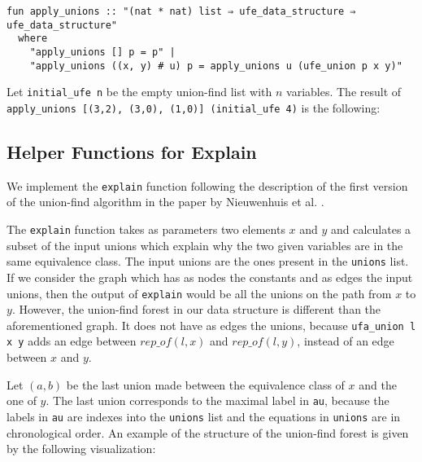 \begin{lstlisting}
fun apply_unions :: "(nat * nat) list ⇒ ufe_data_structure ⇒ ufe_data_structure"
  where
    "apply_unions [] p = p" |
    "apply_unions ((x, y) # u) p = apply_unions u (ufe_union p x y)"
\end{lstlisting}

\begin{exmp}\label{example:apply-unions}
Let \lstinline|initial_ufe n| be the empty union-find list with $n$ variables. The result of \lstinline|apply_unions [(3,2), (3,0), (1,0)] (initial_ufe 4)| is the following:

\begin{center}
\end{center}
\end{exmp}

\subsection{Helper Functions for Explain}\label{subsection:helper-functions}

We implement the \lstinline|explain| function following the description of the first version of the union-find algorithm in the paper by Nieuwenhuis et al. \cite{Nieuwenhuis}.

The \lstinline|explain| function takes as parameters two elements $x$ and $y$ and calculates a subset of the input unions which explain why the two given variables are in the same equivalence class. The input unions are the ones present in the \lstinline|unions| list. If we consider the graph which has as nodes the constants and as edges the input unions, then the output of \lstinline|explain| would be all the unions on the path from $x$ to $y$. However, the union-find forest in our data structure is different than the aforementioned graph. It does not have as edges the unions, because \lstinline|ufa_union l x y| adds an edge between $rep\_of(l, x)$ and $rep\_of(l, y)$, instead of an edge between $x$ and $y$.

Let $(a, b)$ be the last union made between the equivalence class of $x$ and the one of $y$.
The last union corresponds to the maximal label in \lstinline|au|, because the labels in \lstinline|au| are indexes into the \lstinline|unions| list and the equations in \lstinline|unions| are in chronological order.
An example of the structure of the union-find forest is given by the following visualization:


